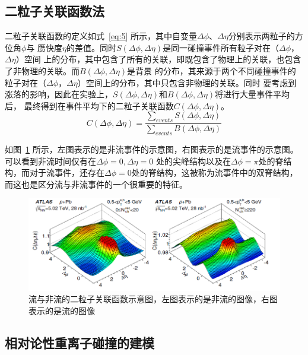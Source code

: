 \documentclass[aps,pre,12pt,preprint,onecolumn,showpacs,showkeys]{revtex4-1}
\begin{document}
\subsection{二粒子关联函数法}
二粒子关联函数的定义如式~\ref{eq:5} 所示\citet{PhysRevC.96.024908,PhysRevLett.116.172302}，其中自变量$\Delta\phi$、$\Delta\eta$分别表示两粒子的方位角$\phi$与
赝快度$\eta$的差值。同时$S(\Delta\phi,\Delta\eta)$是同一碰撞事件所有粒子对在（$\Delta\phi$，$\Delta\eta$）空间
上的分布，其中包含了所有的关联，即既包含了物理上的关联，也包含了非物理的关联。而$B(\Delta\phi,\Delta\eta)$是背景
的分布，其来源于两个不同碰撞事件的粒子对在（$\Delta\phi$，$\Delta\eta$）空间上的分布，其中只包含非物理的关联。同时
要考虑到涨落的影响，因此在实验上，$S(\Delta\phi,\Delta\eta)$和$B(\Delta\phi,\Delta\eta)$将进行大量事件平均后，
最终得到在事件平均下的二粒子关联函数$C(\Delta\phi,\Delta\eta)$。
\begin{equation}
C(\Delta\phi,\Delta\eta)=\frac{\sum_{events}S(\Delta\phi,\Delta\eta)}{\sum_{events}B(\Delta\phi,\Delta\eta)} \label{eq:5}
\end{equation}
\par
如图~\ref{fig:fnf} 所示\citet{PhysRevC.96.024908}，左图表示的是非流事件的示意图，右图表示的是流事件的示意图。可以看到非流时间仅有在$\Delta\phi=0,\Delta\eta=0$
处的尖峰结构以及在$\Delta\phi=\pi$处的脊结构，而对于流事件，还存在$\Delta\phi=0$处的脊结构，这被称为流事件中的双脊结构，
而这也是区分流与非流事件的一个很重要的特征。
\begin{figure}[t]
\centering
\includegraphics[width=140mm]{fnf}
\caption{\label{fig:fnf}%
流与非流的二粒子关联函数示意图，左图表示的是非流的图像，右图表示的是流的图像}
\end{figure}
\subsection{相对论性重离子碰撞的建模}
\end{document}
